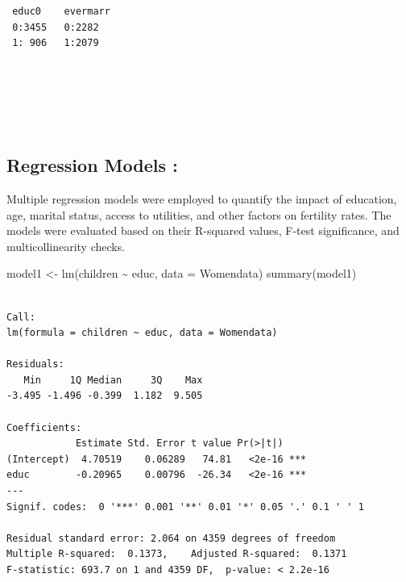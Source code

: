\documentclass[
  letterpaper,
  DIV=11,
  numbers=noendperiod]{scrartcl}
\newenvironment{Shaded}{\begin{snugshade}}{\end{snugshade}}
\newcommand{\AttributeTok}[1]{\textcolor[rgb]{0.40,0.45,0.13}{#1}}
\newcommand{\FunctionTok}[1]{\textcolor[rgb]{0.28,0.35,0.67}{#1}}
\newcommand{\NormalTok}[1]{\textcolor[rgb]{0.00,0.23,0.31}{#1}}
\newcommand{\OtherTok}[1]{\textcolor[rgb]{0.00,0.23,0.31}{#1}}
\newcommand{\SpecialCharTok}[1]{\textcolor[rgb]{0.37,0.37,0.37}{#1}}
\begin{document}
\begin{verbatim}
 educ0    evermarr
 0:3455   0:2282  
 1: 906   1:2079  
                  
                  
                  
                  
                  
\end{verbatim}

\begin{Shaded}
\end{Shaded}

\hypertarget{regression-models}{%
\subsection{Regression Models :}\label{regression-models}}

Multiple regression models were employed to quantify the impact of
education, age, marital status, access to utilities, and other factors
on fertility rates. The models were evaluated based on their R-squared
values, F-test significance, and multicollinearity checks.

\begin{Shaded}
\begin{Highlighting}[]
\NormalTok{model1 }\OtherTok{\textless{}{-}} \FunctionTok{lm}\NormalTok{(children }\SpecialCharTok{\textasciitilde{}}\NormalTok{ educ, }\AttributeTok{data =}\NormalTok{ Womendata)}
\FunctionTok{summary}\NormalTok{(model1)}
\end{Highlighting}
\end{Shaded}

\begin{verbatim}

Call:
lm(formula = children ~ educ, data = Womendata)

Residuals:
   Min     1Q Median     3Q    Max 
-3.495 -1.496 -0.399  1.182  9.505 

Coefficients:
            Estimate Std. Error t value Pr(>|t|)    
(Intercept)  4.70519    0.06289   74.81   <2e-16 ***
educ        -0.20965    0.00796  -26.34   <2e-16 ***
---
Signif. codes:  0 '***' 0.001 '**' 0.01 '*' 0.05 '.' 0.1 ' ' 1

Residual standard error: 2.064 on 4359 degrees of freedom
Multiple R-squared:  0.1373,    Adjusted R-squared:  0.1371 
F-statistic: 693.7 on 1 and 4359 DF,  p-value: < 2.2e-16
\end{verbatim}
\end{document}
